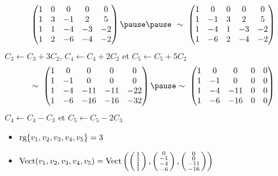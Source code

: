 \begin{frame}
\begin{exemple}
\vspace*{-1ex}
$$\begin{pmatrix}
1&0&0&0&0\cr
1&3&-1&2&5\cr
1&1&-4&-3&-2\cr
1&2&-6&-4&-2 \cr
\end{pmatrix}
\pause\pause
\ \sim\ 
\begin{pmatrix}
1&0&0&0&0\cr
1&-1&3&2&5\cr
1&-4&1&-3&-2\cr
1&-6&2&-4&-2 \cr
\end{pmatrix}$$
\pause
\vspace*{-1ex}
$C_3 \leftarrow C_3+3C_2$, 
$C_4\leftarrow C_4+2C_2$ et 
$C_5\leftarrow C_5+5C_2$
\vspace*{-1ex}
$$ \sim\ 
\begin{pmatrix}
1&0&0&0&0\cr
1&-1&0&0&0\cr
1&-4&-11&-11&-22\cr
1&-6&-16&-16&-32 \cr
\end{pmatrix}
\pause
\sim\ 
\begin{pmatrix}
1&0&0&0&0\cr
1&-1&0&0&0\cr
1&-4&-11&0&0\cr
1&-6&-16&0&0 \cr
\end{pmatrix}
$$
\vspace*{-1ex}
$C_4\leftarrow C_4-C_3$
et $C_5\leftarrow C_5-2C_3$

\pause

\begin{itemize}
  \item $\mathop{\text{rg}}\nolimits \{v_1,v_2,v_3,v_4,v_5\}=3$
  \vspace*{-1ex}
  \pause
  \item $\mathop{\text{Vect}}\nolimits (v_1,v_2,v_3,v_4,v_5)=
\mathop{\text{Vect}}\nolimits \left( \left(\begin{smallmatrix}1\\1\\1\\1\end{smallmatrix}\right) ,\left(\begin{smallmatrix}0\\-1\\-4\\-6\end{smallmatrix}\right), 
\left(\begin{smallmatrix}0\\0\\-11\\-16\end{smallmatrix}\right)\right )$
\end{itemize}

\end{exemple}
\end{frame}



